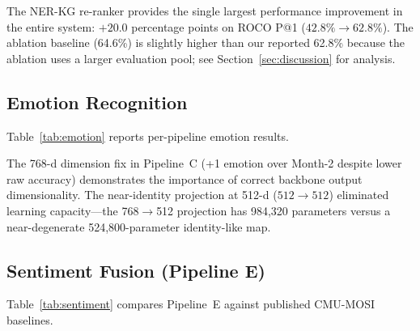 \documentclass[10pt,conference]{IEEEtran}
\theoremstyle{ieeethm}
\theoremstyle{ieeedef}
\theoremstyle{ieeeremark}
\begin{document}
The NER-KG re-ranker provides the single largest performance improvement in the entire system: $+20.0$ percentage points on ROCO P@1 ($42.8\% \rightarrow 62.8\%$). The ablation baseline (64.6\%) is slightly higher than our reported 62.8\% because the ablation uses a larger evaluation pool; see Section~\ref{sec:discussion} for analysis.

\subsection{Emotion Recognition}

Table~\ref{tab:emotion} reports per-pipeline emotion results.

\begin{table}[!t]
\centering
\caption{Emotion Recognition Results (centroid nearest-neighbour)}
\label{tab:emotion}
\end{table}

The 768-d dimension fix in Pipeline~C (+1 emotion over Month-2 despite lower raw accuracy) demonstrates the importance of correct backbone output dimensionality. The near-identity projection at 512-d ($512\rightarrow512$) eliminated learning capacity—the 768$\rightarrow$512 projection has 984,320 parameters versus a near-degenerate 524,800-parameter identity-like map.

\subsection{Sentiment Fusion (Pipeline E)}

Table~\ref{tab:sentiment} compares Pipeline~E against published CMU-MOSI baselines.
\end{document}
